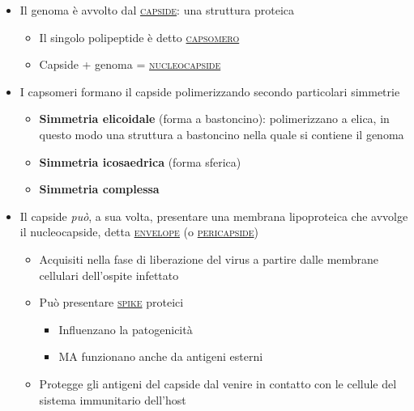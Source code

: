 \documentclass[italian,]{article}
\providecommand{\tightlist}{%
  \setlength{\itemsep}{0pt}\setlength{\parskip}{0pt}}
\renewcommand{\a}[1]{\underline{\textsc{#1}}}
\begin{document}
\begin{itemize}
\tightlist
\item
  Il genoma è avvolto dal \a{capside}: una struttura proteica

  \begin{itemize}
  \tightlist
  \item
    Il singolo polipeptide è detto \a{capsomero}
  \item
    Capside + genoma = \a{nucleocapside}
  \end{itemize}
\item
  I capsomeri formano il capside polimerizzando secondo particolari
  simmetrie

  \begin{itemize}
  \tightlist
  \item
    \textbf{Simmetria elicoidale} (forma a bastoncino): polimerizzano a
    elica, in questo modo una struttura a bastoncino nella quale si
    contiene il genoma
  \item
    \textbf{Simmetria icosaedrica} (forma sferica)
  \item
    \textbf{Simmetria complessa}
  \end{itemize}
\item
  Il capside \emph{può}, a sua volta, presentare una membrana
  lipoproteica che avvolge il nucleocapside, detta \a{envelope} (o
  \a{pericapside})

  \begin{itemize}
  \tightlist
  \item
    Acquisiti nella fase di liberazione del virus a partire dalle
    membrane cellulari dell'ospite infettato
  \item
    Può presentare \a{spike} proteici

    \begin{itemize}
    \tightlist
    \item
      Influenzano la patogenicità
    \item
      MA funzionano anche da antigeni esterni
    \end{itemize}
  \item
    Protegge gli antigeni del capside dal venire in contatto con le
    cellule del sistema immunitario dell'host
  \end{itemize}
\end{itemize}
\end{document}
